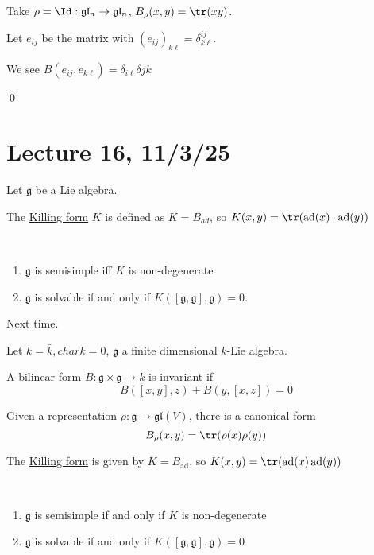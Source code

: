 \documentclass[x11names,reqno,14pt]{extarticle}
\newcommand{\mk}[1]{\mathfrak{#1}}
\newcommand{\g}{\mk{g}}
\newcommand{\bark}{\bar{k}}
\DeclareMathOperator{\ad}{ad}
\newcommand{\gl}{\mk{g}\mk{l}}
\begin{document}
Take $\rho = \Id:\gl_n\to\gl_n$, $B_\rho(x,y) = \tr(xy)$.

Let $e_{ij}$ be the matrix with $(e_{ij})_{k\ell} = \delta_{k\ell}^{ij}$.

We see $B(e_{ij},e_{k\ell}) = \delta_{i\ell}\delta{jk}$

\qed

\section*{Lecture 16, 11/3/25}


Let $\g$ be a Lie algebra. 

The \underline{Killing form} $K$ is defined as $K = B_{ad}$, so $K(x,y) = \tr(\ad(x)\cdot\ad(y))$

\thm
\,
\begin{enumerate}[label=(\alph*)]

\item $\g$ is semisimple iff $K$ is non-degenerate

\item $\g$ is solvable if and only if $K([\g,\g],\g) = 0$.

\end{enumerate}

\proof

Next time.


Let $k = \bark, char k = 0$, $\g$ a finite dimensional $k$-Lie algebra. 

A bilinear form $B:\g\times\g\to k$ is \underline{invariant} if
\[
B([x,y],z) + B(y,[x,z]) = 0
\]

Given a representation $\rho:\g\to\gl(V)$, there is a canonical form 
\[
B_\rho(x,y) = \tr(\rho(x)\rho(y))
\]


The \underline{Killing form}  is given by $K = B_{\ad}$, so $K(x,y) = \tr(\ad(x)\ad(y))$

\,
\begin{enumerate}[label=(\alph*)]

\item $\g$ is semisimple if and only if $K$ is non-degenerate

\item $\g$ is solvable if and only if $K([\g,\g],\g) = 0$

\end{enumerate}

\cor
\end{document}
